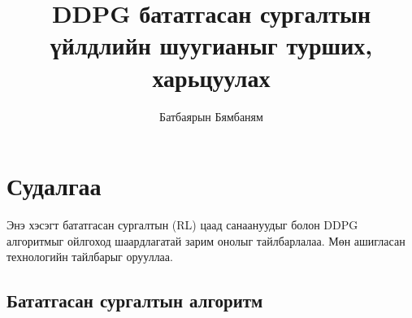 \documentclass[12pt,A4]{report}
\begin{document}

\title{DDPG бататгасан сургалтын үйлдлийн шуугианыг турших, харьцуулах }
\author{Батбаярын Бямбаням}
\cosupervisor{}








\chapter{Судалгаа}

Энэ хэсэгт бататгасан сургалтын (RL) цаад санаануудыг болон DDPG алгоритмыг ойлгоход шаардлагатай зарим онолыг тайлбарлалаа. Мөн ашигласан технологийн тайлбарыг орууллаа.

\section{Бататгасан сургалтын алгоритм}
\end{document}
